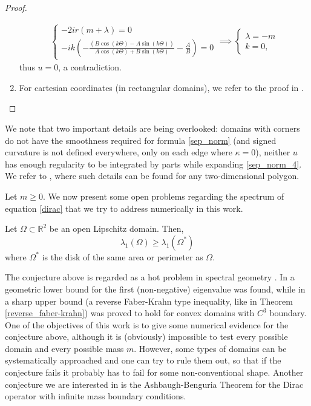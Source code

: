 \begin{proof}
\begin{enumerate}
    \begin{align*}
        \begin{cases}
            -2 i r (m+\lambda) = 0\\
            -i k \left(-\frac{(B \cos (k\Theta  )-A \sin (k\Theta  ))}{A \cos (k\Theta  )+B \sin (k\Theta)}-\frac{A}{B}\right) = 0
        \end{cases}
        \implies
        \begin{cases}
            \lambda = -m\\
            k = 0,
        \end{cases}
    \end{align*}
    thus \(u=0\), a contradiction.
    \item For cartesian coordinates (in rectangular domains), we refer to the proof in \cite{briet2022spectral}.
    \end{enumerate}     
\end{proof}

\begin{remark}
    We note that two important details are being overlooked: domains with corners do not have the smoothness required for formula \eqref{sep_norm} (and signed curvature is not defined everywhere, only on each edge where \(\kappa=0\)), neither \(u\) has enough regularity to be integrated by parts while expanding \eqref{sep_norm_4}. We refer to \cite{vu2023spectral}, where such details can be found for any two-dimensional polygon.
\end{remark}

Let \(m \geq 0\). We now present some open problems regarding the spectrum of equation \eqref{dirac} that we try to address numerically in this work.

\begin{conjecture}\label{conjecture_faber_krahn}
    Let \(\Omega \subset \mathbb{R}^2\) be an open Lipschitz domain. Then,
    \[
    \lambda_1(\Omega) \geq \lambda_1(\Omega^\ast)
    \]
    where \(\Omega^\ast\) is the disk of the same area or perimeter as \(\Omega\).
\end{conjecture}

The conjecture above is regarded as a hot problem in spectral geometry \cite{krejcirik_larson_lotoreichik_2019}. In \cite{benguria2017spectral} a geometric lower bound for the first (non-negative) eigenvalue was found, while in \cite{lotoreichik2019sharp} a sharp upper bound (a reverse Faber-Krahn type inequality, like in Theorem \ref*{reverse_faber-krahn}) was proved to hold for convex domains with \(C^3\) boundary. One of the objectives of this work is to give some numerical evidence for the conjecture above, although it is (obviously) impossible to test every possible domain and every possible mass \(m\). However, some types of domains can be systematically approached and one can try to rule them out, so that if the conjecture fails it probably has to fail for some non-conventional shape. Another conjecture we are interested in is the Ashbaugh-Benguria Theorem for the Dirac operator with infinite mass boundary conditions.

